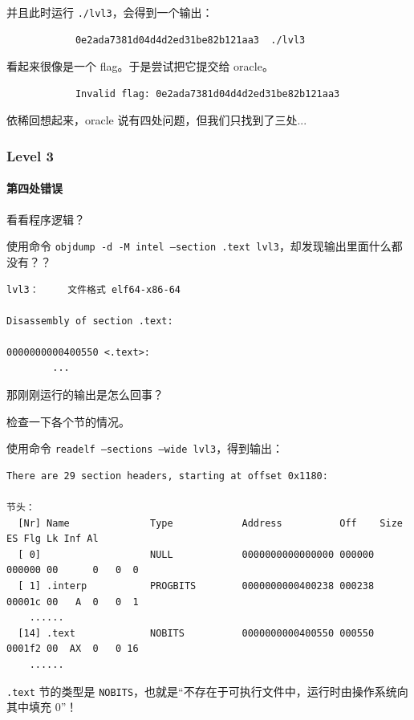 \documentclass{ctexbeamer}
\begin{document}
    \begin{frame}[fragile]
    
        并且此时运行 \texttt{./lvl3}，会得到一个输出：

        \begin{verbatim}
            0e2ada7381d04d4d2ed31be82b121aa3  ./lvl3
        \end{verbatim}

        看起来很像是一个 flag。于是尝试把它提交给 oracle。\pause

        \begin{verbatim}
            Invalid flag: 0e2ada7381d04d4d2ed31be82b121aa3
        \end{verbatim}

        依稀回想起来，oracle 说有四处问题，但我们只找到了三处...
    
    \end{frame}

    \begin{frame}[fragile]
        \frametitle{Level 3}
        \framesubtitle{第四处错误}
    
        看看程序逻辑？

        使用命令 \texttt{objdump -d -M intel --section .text lvl3}，却发现输出里面什么都没有？？

        \begin{verbatim}
lvl3：     文件格式 elf64-x86-64

Disassembly of section .text:

0000000000400550 <.text>:
	    ...
        \end{verbatim}

        那刚刚运行的输出是怎么回事？
    
    \end{frame}

    \begin{frame}[fragile]
    
        检查一下各个节的情况。

        使用命令 \texttt{readelf --sections --wide lvl3}，得到输出：

        \begin{verbatim}
There are 29 section headers, starting at offset 0x1180:

节头：
  [Nr] Name              Type            Address          Off    Size   ES Flg Lk Inf Al
  [ 0]                   NULL            0000000000000000 000000 000000 00      0   0  0
  [ 1] .interp           PROGBITS        0000000000400238 000238 00001c 00   A  0   0  1
    ......
  [14] .text             NOBITS          0000000000400550 000550 0001f2 00  AX  0   0 16
    ......
        \end{verbatim}

        \pause \texttt{.text} 节的类型是 \texttt{NOBITS}，也就是``不存在于可执行文件中，运行时由操作系统向其中填充 0''！

    \end{frame}
\end{document}
